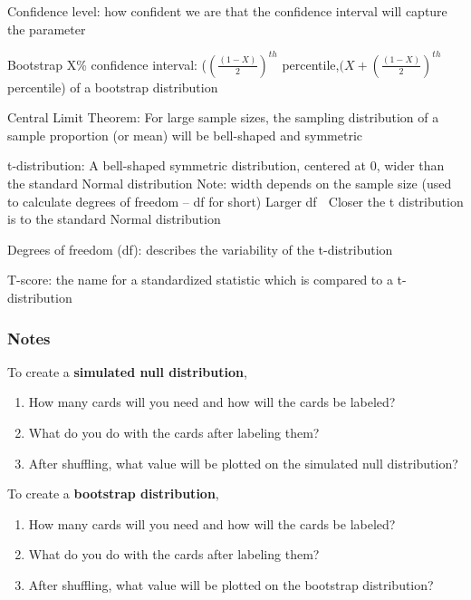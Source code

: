 \documentclass[
]{report}
\newcommand{\rgs}{\vspace{12pt}} %
\begin{document}
Confidence level: how confident we are that the confidence interval will capture the parameter

Bootstrap X\% confidence interval: (\((\frac{(1-X)}{2})^{th}\) percentile,\((X+(\frac{(1-X)}{2})^{th}\) percentile) of a bootstrap distribution

Central Limit Theorem: For large sample sizes, the sampling distribution of a sample proportion (or mean) will be bell-shaped and symmetric

t-distribution: A bell-shaped symmetric distribution, centered at 0, wider than the standard Normal distribution
Note: width depends on the sample size (used to calculate degrees of freedom -- df for short)
Larger df  Closer the t distribution is to the standard Normal distribution

Degrees of freedom (df): describes the variability of the t-distribution

T-score: the name for a standardized statistic which is compared to a t-distribution

\hypertarget{notes-27}{%
\subsubsection*{Notes}\label{notes-27}}

To create a \textbf{simulated null distribution},

\begin{enumerate}
\def\labelenumi{\arabic{enumi}.}
\item
  How many cards will you need and how will the cards be labeled?
  \rgs
\item
  What do you do with the cards after labeling them?
  \rgs
\item
  After shuffling, what value will be plotted on the simulated null distribution?
  \rgs
\end{enumerate}

To create a \textbf{bootstrap distribution},

\begin{enumerate}
\def\labelenumi{\arabic{enumi}.}
\item
  How many cards will you need and how will the cards be labeled?
  \rgs
\item
  What do you do with the cards after labeling them?
  \rgs
\item
  After shuffling, what value will be plotted on the bootstrap distribution?
  \rgs
\end{enumerate}
\end{document}
